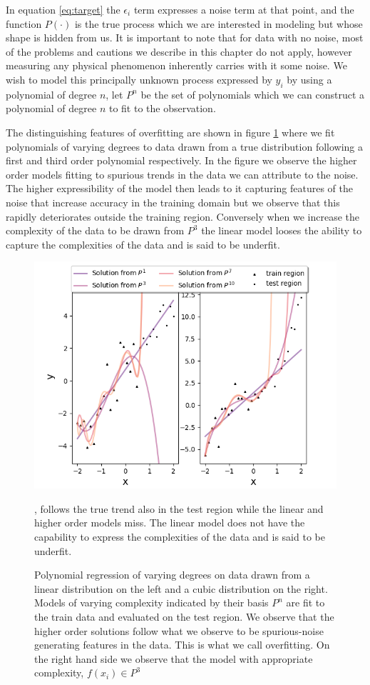 In equation \ref{eq:target} the $\epsilon_i$ term expresses a noise term at that point, and the function $P(\cdot)$ is the true process which we are interested in modeling but whose shape is hidden from us. It is important to note that for data with no noise, most of the problems and cautions we describe in this chapter do not apply, however measuring any physical phenomenon inherently carries with it some noise. We wish to model this principally unknown process expressed by $y_i$ by using a polynomial of degree $n$, let $P^n$ be the set of polynomials which we can construct a polynomial of degree $n$ to fit to the observation. 

The distinguishing features of overfitting are shown in figure \ref{fig:overfit} where we fit polynomials of varying degrees to data drawn from a true distribution following a first and third order polynomial respectively. In the figure we observe the higher order models fitting to spurious trends in the data we can attribute to the noise. The higher expressibility of the model then leads to it capturing features of the noise that increase accuracy in the training domain but we observe that this rapidly deteriorates outside the training region. Conversely when we increase the complexity of the data to be drawn from $P^3$ the linear model looses the ability to capture the complexities of the data and is said to be underfit.  

\begin{figure}
\centering
\includegraphics[width=\textwidth]{../figures/y_distr.png}
\caption{Polynomial regression of varying degrees on data drawn from a linear distribution on the left and a cubic distribution on the right. Models of varying complexity indicated by their basis $P^n$ are fit to the train data and evaluated on the test region. We observe that the higher order solutions follow what we observe to be  spurious-noise generating features in the data. This is what we call overfitting. On the right hand side we observe that the model with appropriate complexity, $f(x_i) \in P^3$}, follows the true trend also in the test region while the linear and higher order models miss. The linear model does not have the capability to express the complexities of the data and is said to be underfit.\label{fig:overfit}
\end{figure}

